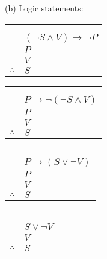 \documentclass{article}
\begin{document}
(b) Logic statements:
\newline
\begin{tabular}{c@{\,}l@{}} 
                         & \\ & \\
                         & $(\neg S \wedge V) \rightarrow \neg P$ \\
                         & $P$ \\
                         & $V$ \\
                         
\arrayrulecolor{blue}
\cline{2-2}
    $\therefore$         & $S$ \\
\end{tabular}
\begin{tabular}{c@{\,}l@{}} 
                         & \\ & \\
                         & $P \rightarrow \neg(\neg S \wedge V)$ \\
                         & $P$ \\
                         & $V$ \\
                         
\arrayrulecolor{blue}
\cline{2-2}
    $\therefore$         & $S$ \\
\end{tabular}
\begin{tabular}{c@{\,}l@{}} 
                         & \\ & \\
                         & $P \rightarrow (S \vee \neg V)$ \\
                         & $P$ \\
                         & $V$ \\
                         
\arrayrulecolor{blue}
\cline{2-2}
    $\therefore$         & $S$ \\
\end{tabular}
\begin{tabular}{c@{\,}l@{}} 
                         & \\ & \\ & \\
                         & $S \vee \neg V$\\
                         & $V$ \\
                         
\arrayrulecolor{blue}
\cline{2-2}
    $\therefore$         & $S$ \\
\end{tabular}
\end{document}
